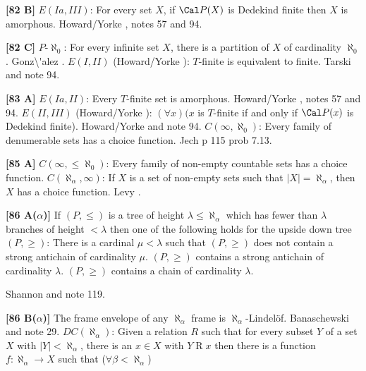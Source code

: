 \smallskip
\item{}{\bf [82 B]} $E(Ia,III)$: For every set $X$, if $\Cal P(X)$ is
Dedekind finite then $X$ is amorphous.  \ac{Howard/Yorke} \cite{1989},
notes 57 and 94.
\smallskip
\item{}{\bf [82 C]} $P$-$\aleph_0$:  For every infinite set
$X$, there is a partition of $X$ of cardinality $\aleph_0$.
\ac{Gonz\'alez} \cite{1995a}.
\medskip
{} $E(I,II)$ (\ac{Howard/Yorke} \cite{1989}):
$T$-finite is equivalent to finite. \ac{Tarski} \cite{1924} and note 94.
\smallskip
\item{}{\bf [83 A]} $E(Ia,II)$: Every $T$-finite set is amorphous.
\ac{Howard/Yorke} \cite{1989}, notes 57 and 94.
\medskip
{} $E(II,III)$ (\ac{Howard/Yorke} \cite{1989}):
$(\forall x)(x$ is $T$-finite  if and only if $\Cal P(x)$ is Dedekind
finite).  \ac{Howard/Yorke} \cite{1989} and note 94.
\medskip
{}  $C(\infty,\aleph_{0})$:  Every family of
denumerable sets has  a choice function.  \ac{Jech} \cite{1973b} p 115
prob 7.13.
\smallskip
\item{}{\bf [85 A]} $C(\infty,\le\aleph_{0})$: Every family of non-empty
countable sets has  a choice function.
\medskip
{} $C(\aleph_{\alpha},\infty)$:
If $X$ is a set of non-empty sets such that
$|X| = \aleph_{\alpha }$, then $X$ has a choice function.  \ac{Levy}
\cite{1964}.
\smallskip
\item{}{\bf [86 A($\alpha$)]} If $(P,\le)$ is a tree of height $\lambda\le
\aleph_\alpha$ which has fewer than $\lambda$ branches of height
$<\lambda$ then one of the following holds for the upside down tree
$(P,\ge)$:
 There is a cardinal $\mu< \lambda$ such that $(P,\ge)$ does
not contain a strong antichain of cardinality $\mu$.
 $(P,\ge)$ contains a strong antichain of cardinality
$\lambda$.
 $(P,\ge)$ contains a chain of cardinality $\lambda$.\par
\item{}\ac{Shannon} \cite{1992} and note 119.
\smallskip
\item{}{\bf [86 B($\alpha$)]}  The frame envelope of any $\aleph_\alpha$
frame is $\aleph_\alpha$-Lindel\"of.  \ac{Banaschewski} \cite{1998} and
note 29.
\medskip
{}  $DC(\aleph_{\alpha})$: Given a relation
$R$ such that for every subset $Y$ of a set $X$ with $|Y|<\aleph_{\alpha}$,
there is an $x\in X$ with $Y\mathrel R x$ then there is a function
$f:\aleph_{\alpha}\to X$ such that ($\forall\beta < \aleph_{\alpha}$)
